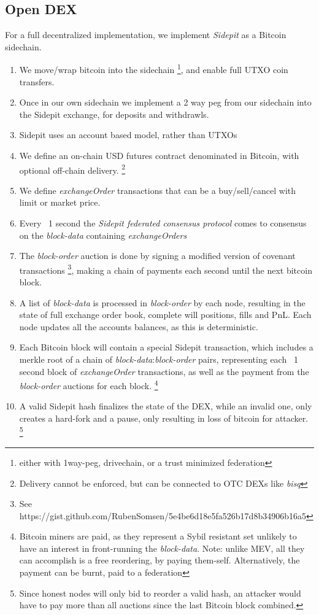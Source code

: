 \documentclass[12pt]{article}
\begin{document}
\subsection*{Open DEX}
For a full decentralized implementation, we implement \emph{Sidepit} as a Bitcoin sidechain.  

\begin{enumerate}[leftmargin=*]
\item We move/wrap bitcoin into the sidechain \footnote{either with 1way-peg, drivechain, or a trust minimized federation}, and enable full UTXO coin transfers. 
\item Once in our own sidechain we implement a 2 way peg from our sidechain into the Sidepit exchange, for deposits and withdrawls. 
\item Sidepit uses an account based model, rather than UTXOs 
\item We define an on-chain USD futures contract denominated in Bitcoin, with optional off-chain delivery. \footnote{Delivery cannot be enforced, but can  be connected to OTC DEXs like \emph{bisq}}  
\item We define \emph{exchangeOrder} transactions that can be a buy/sell/cancel with limit or market price.
\item Every ~1 second the \emph{Sidepit federated consensus protocol} comes to consensus on the \emph{block-data} containing \emph{exchangeOrders}
\item The \emph{block-order} auction is done by signing a modified version of covenant transactions \footnote{See https://gist.github.com/RubenSomsen/5e4be6d18e5fa526b17d8b34906b16a5}, making a chain of payments each second until the next bitcoin block.     
\item A list of \emph{block-data} is processed in \emph{block-order} by each node, resulting in the state of full exchange order book, complete will positions, fills and PnL. Each node updates all the accounts balances, as this is deterministic.  
\item Each Bitcoin block will contain a special Sidepit transaction, which includes a merkle root of a chain of \emph{block-data}:\emph{block-order} pairs, representing each ~1 second block of \emph{exchangeOrder} transactions, as well as the payment from the \emph{block-order} auctions for each block. \footnote{Bitcoin miners are paid, as they represent a Sybil resistant set unlikely to have an interest in front-running the \emph{block-data}. Note: unlike MEV, all they can accomplish is a free reordering, by paying them-self. Alternatively, the payment can be burnt, paid to a federation} 
\item A valid Sidepit hash finalizes the state of the DEX, while an invalid one, only creates a hard-fork and a pause, only resulting in loss of bitcoin for attacker. \footnote{Since honest nodes will only bid to reorder a valid hash, an attacker would have to pay more than all auctions since the last Bitcoin block combined.}
\end{enumerate}
\end{document}
